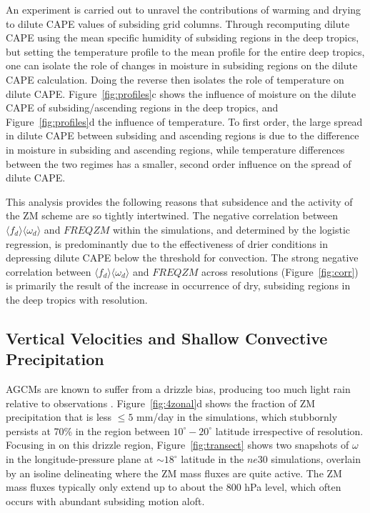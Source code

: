 \documentclass[times]{qjrms4}
\begin{document}
An experiment is carried out to unravel the contributions of warming and drying to dilute CAPE values of subsiding grid columns. Through recomputing dilute CAPE using the mean specific humidity of subsiding regions in the deep tropics, but setting the temperature profile to the mean profile for the entire deep tropics, one can isolate the role of changes in moisture in subsiding regions on the dilute CAPE calculation. Doing the reverse then isolates the role of temperature on dilute CAPE. Figure~\ref{fig:profiles}c shows the influence of moisture on the dilute CAPE of subsiding/ascending regions in the deep tropics, and Figure~\ref{fig:profiles}d the influence of temperature. To first order, the large spread in dilute CAPE between subsiding and ascending regions is due to the difference in moisture in subsiding and ascending regions, while temperature differences between the two regimes has a smaller, second order influence on the spread of dilute CAPE. 

This analysis provides the following reasons that subsidence and the activity of the ZM scheme are so tightly intertwined. The negative correlation between $\langle f_{d} \rangle \langle \omega_{d} \rangle$ and $FREQZM$ within the simulations, and determined by the logistic regression, is predominantly due to the effectiveness of drier conditions in depressing dilute CAPE below the threshold for convection. The strong negative correlation between $\langle f_{d} \rangle \langle \omega_{d} \rangle$ and $FREQZM$ across resolutions (Figure~\ref{fig:corr}) is primarily the result of the increase in occurrence of dry, subsiding regions in the deep tropics with resolution.

\subsection{Vertical Velocities and Shallow Convective Precipitation}

AGCMs are known to suffer from a drizzle bias, producing too much light rain relative to observations \citep{D2006JCLIM}. Figure~\ref{fig:4zonal}d shows the fraction of ZM precipitation that is less $\leq 5$ mm/day in the simulations, which stubbornly persists at 70\% in the region between $10^{\circ}-20^{\circ}$ latitude irrespective of resolution. Focusing in on this drizzle region, Figure~\ref{fig:transect} shows two snapshots of $\omega$ in the longitude-pressure plane at  $\sim 18^{\circ}$ latitude in the $ne30$ simulations, overlain by an isoline delineating where the ZM mass fluxes are quite active. The ZM mass fluxes typically only extend up to about the $800$ hPa level, which often occurs with abundant subsiding motion aloft. 
\end{document}
